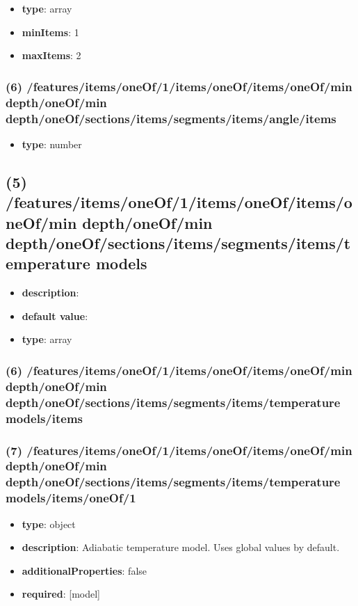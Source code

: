 \begin{itemize}[leftmargin=5em]\item {\bf type}: array
\item {\bf minItems}: 1
\item {\bf maxItems}: 2
\end{itemize}\subsubsection{(6) /features/items/oneOf/1/items/oneOf/items/oneOf/min depth/oneOf/min depth/oneOf/sections/items/segments/items/angle/items}
\begin{itemize}[leftmargin=6em]\item {\bf type}: number
\end{itemize}\subsection{(5) /features/items/oneOf/1/items/oneOf/items/oneOf/min depth/oneOf/min depth/oneOf/sections/items/segments/items/temperature models}
\begin{itemize}[leftmargin=5em]\item {\bf description}: 
\item {\bf default value}: 
\item {\bf type}: array
\end{itemize}\subsubsection{(6) /features/items/oneOf/1/items/oneOf/items/oneOf/min depth/oneOf/min depth/oneOf/sections/items/segments/items/temperature models/items}

\subsubsection{(7) /features/items/oneOf/1/items/oneOf/items/oneOf/min depth/oneOf/min depth/oneOf/sections/items/segments/items/temperature models/items/oneOf/1}
\begin{itemize}[leftmargin=7em]\item {\bf type}: object
\item {\bf description}: Adiabatic temperature model. Uses global values by default.
\item {\bf additionalProperties}: false
\item {\bf required}: [model]\end{itemize}
